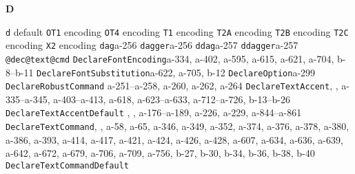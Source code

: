\documentclass[twoside]{ltxdoc}
\makeatletter
\renewenvironment{theindex}{%
   \@restonecoltrue
   \if@twocolumn\@restonecolfalse\fi
   \columnseprule \z@
   \columnsep 35\p@
   \twocolumn[\index@prologue]%
   \IndexParms
   \let\item\@idxitem
   \ignorespaces
}{\if@restonecol\onecolumn\else\clearpage\fi}
\makeatother
\begin{document}
\begin{theindex}
  \indexspace
{\bfseries\hfil D\hfil}\nopagebreak

  \item \texttt  {d}\efill 
    \subitem default\pfill {}
    \subitem \texttt  {OT1} encoding\pfill {}
    \subitem \texttt  {OT4} encoding\pfill {}
    \subitem \texttt  {T1} encoding\pfill {}
    \subitem \texttt  {T2A} encoding\pfill {}
    \subitem \texttt  {T2B} encoding\pfill {}
    \subitem \texttt  {T2C} encoding\pfill {}
    \subitem \texttt  {X2} encoding\pfill {}
  \item \texttt  {dag}\pfill a-256
  \item \texttt  {dagger}\pfill a-256
  \item \texttt  {ddag}\pfill a-257
  \item \texttt  {ddagger}\pfill a-257
  \item \texttt  {@dec@text@cmd}\pfill {}
  \item \texttt  {DeclareFontEncoding}\pfill a-334, 
                a-402, a-595, a-615, a-621, a-704, b-8--b-11
  \item \texttt  {DeclareFontSubstitution}\pfill a-622, 
                a-705, b-12
  \item \texttt  {DeclareOption}\pfill a-299
  \item \texttt  {DeclareRobustCommand}\pfill 
                a-251--a-258, a-260, a-262, a-264
  \item \texttt  {DeclareTextAccent}\pfill {}, 
                , a-335--a-345, a-403--a-413, a-618, 
                a-623--a-633, a-712--a-726, b-13--b-26
  \item \texttt  {DeclareTextAccentDefault}\pfill 
                , , a-176--a-189, a-226, a-229, 
                a-844--a-861
  \item \texttt  {DeclareTextCommand}\pfill {}, 
                , a-58, a-65, a-346, a-349, a-352, a-374, 
                a-376, a-378, a-380, a-386, a-393, a-414, a-417, a-421, 
                a-424, a-426, a-428, a-607, a-634, a-636, a-639, a-642, 
                a-672, a-679, a-706, a-709, a-756, b-27, b-30, b-34, 
                b-36, b-38, b-40
  \item \texttt  {DeclareTextCommandDefault}\pfill 

\end{theindex}
\end{document}
